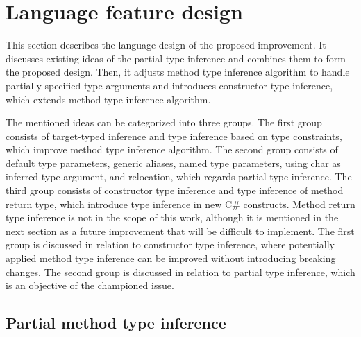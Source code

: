 \section{Language feature design}

This section describes the language design of the proposed improvement. 
It discusses existing ideas of the partial type inference and combines them to form the proposed design. 
Then, it adjusts method type inference algorithm to handle partially specified type arguments and introduces constructor type inference, which extends method type inference algorithm.
\par
{}
The mentioned ideas can be categorized into three groups. 
The first group consists of target-typed inference and type inference based on type constraints, which improve method type inference algorithm. 
The second group consists of default type parameters, generic aliases, named type parameters, using char as inferred type argument, and relocation, which regards partial type inference. 
The third group consists of constructor type inference and type inference of method return type, which introduce type inference in new C# constructs. 
Method return type inference is not in the scope of this work, although it is mentioned in the next section as a future improvement that will be difficult to implement. 
The first group is discussed in relation to constructor type inference, where potentially applied method type inference can be improved without introducing breaking changes. 
The second group is discussed in relation to partial type inference, which is an objective of the championed issue.

\subsection{Partial method type inference}

